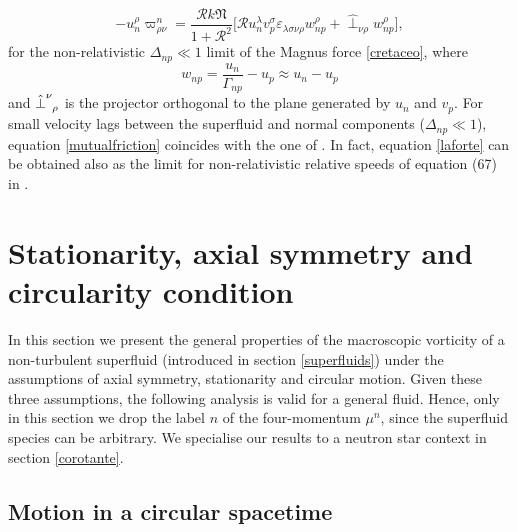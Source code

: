 \documentclass[usenatbib%
]{mnras}
\begin{document}
\begin{equation}\label{laforte}
-u_n^\rho \varpi^n_{\rho \nu} = \dfrac{\mathcal{R}k\mathfrak{N}}{1+\mathcal{R}^2} \bigg[  \mathcal{R} u_n^\lambda v_p^\sigma \varepsilon_{\lambda \sigma \nu \rho} w_{np}^\rho + \hat{\perp}_{\nu \rho}w_{np}^\rho  \bigg],
\end{equation}
for the non-relativistic $\Delta_{np} \ll 1$ limit of the Magnus force \eqref{cretaceo},
where  
\begin{equation}
w_{np} = \dfrac{u_n}{\Gamma_{np}} - u_p \approx u_n - u_p
\end{equation}
and $\hat{\perp}\indices{^\nu _\rho}$ is the projector orthogonal to the plane generated by $u_n$ and $v_p$. 
For small velocity lags between the superfluid and normal components ($\Delta_{np} \ll 1$), equation \eqref{mutualfriction} coincides with the one of \cite{Andersson_Mutual_Friction_2016}. 
In fact, equation \eqref{laforte} can be obtained also as the limit for non-relativistic relative speeds of equation (67) in \cite{Andersson_Mutual_Friction_2016}.





\section{Stationarity, axial symmetry and circularity condition}\label{saacc}

 
In this section we present the general properties of the macroscopic vorticity of a non-turbulent superfluid (introduced in section \ref{superfluids}) under the assumptions of axial symmetry, stationarity and circular motion. 
Given these three  assumptions, the following analysis is valid for a general fluid. Hence, only in this section we drop the label $n$ of the four-momentum $\mu^n$, since the superfluid species can be arbitrary. 
We specialise our results to a neutron star context in section \ref{corotante}.


\subsection{Motion in a circular spacetime}\label{kerrmetric}
\end{document}
